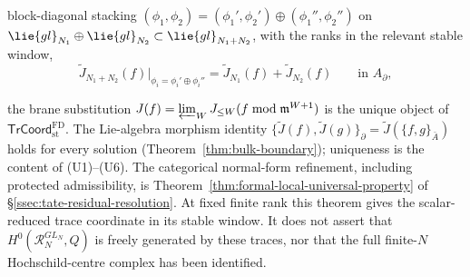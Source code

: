 \documentclass[11pt]{memoir}
\begin{document}
\begin{thm}
\begin{enumerate}[label=(U\arabic*)]
      block-diagonal stacking
      \((\phi_1,\phi_2)=(\phi_1',\phi_2')\oplus(\phi_1'',\phi_2'')\)
      on \(\lie{gl}_{N_1}\oplus\lie{gl}_{N_2}\subset
       \lie{gl}_{N_1+N_2}\), with the ranks in the relevant stable
      window,
      \[
        \widetilde J_{N_1+N_2}(f)\big|_{\phi_i=\phi_i'\oplus\phi_i''}
         =\widetilde J_{N_1}(f)
           +\widetilde J_{N_2}(f)
        \qquad\text{in }A_\partial,
      \]
  \end{enumerate}
  the brane substitution
  \(J(f)=\varprojlim_WJ_{\leq W}(f\bmod\mathfrak m^{W+1})\) is the unique
  object of \(\mathsf{TrCoord}^{\mathrm{FD}}_{\mathrm{st}}\).
  The Lie-algebra morphism identity
  \(\{\widetilde J(f),\widetilde J(g)\}_\partial=
  \widetilde J(\{f,g\}_{\bar A})\) holds for every solution
  (Theorem~\ref{thm:bulk-boundary}); uniqueness is the content of
  (U1)--(U6).  The categorical normal-form refinement, including
  protected admissibility, is
  Theorem~\ref{thm:formal-local-universal-property} of
  \S\ref{ssec:tate-residual-resolution}.
  At fixed finite rank this theorem gives the scalar-reduced trace
  coordinate in its stable window.  It does not assert that
  \(H^0(\mathcal R_N^{GL_N},Q)\) is freely generated by these traces, nor
  that the full finite-\(N\) Hochschild-centre complex has been
  identified.
\end{thm}
\end{document}
